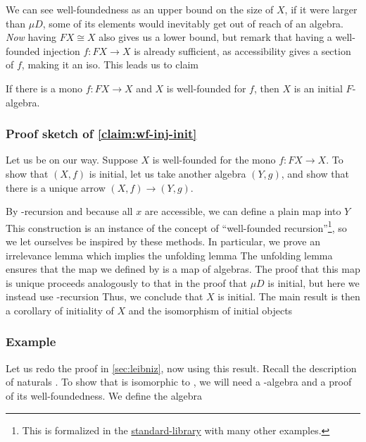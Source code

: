 We can see well-foundedness as an upper bound on the size of $X$, if it were larger than $\mu D$, some of its elements would inevitably get out of reach of an algebra. \textit{Now} having $FX \cong X$ also gives us a lower bound, but remark that having a well-founded injection $f: FX \to X$ is already sufficient, as accessibility gives a section of $f$, making it an iso. This leads us to claim
\begin{claim}\label{claim:wf-inj-init}
    If there is a mono $f : FX \to X$ and $X$ is well-founded for $f$, then $X$ is an initial $F$-algebra.
\end{claim}

\subsubsection{Proof sketch of \autoref{claim:wf-inj-init}}
Let us be on our way. Suppose $X$ is well-founded for the mono $f : FX \to X$. To show that $(X, f)$ is initial, let us take another algebra $(Y, g)$, and show that there is a unique arrow $(X, f) \to (Y, g)$.

By -recursion and because all $x$ are accessible, we can define a plain map into $Y$
This construction is an instance of the concept of ``well-founded recursion''\footnote{This is formalized in the \href{https://agda.github.io/agda-stdlib/Induction.WellFounded.html}{standard-library} with many other examples.}, so we let ourselves be inspired by these methods. In particular, we prove an irrelevance lemma
which implies the unfolding lemma
The unfolding lemma ensures that the map we defined by  is a map of algebras. The proof that this map is unique proceeds analogously to that in the proof that $\mu D$ is initial, but here we instead use -recursion
Thus, we conclude that $X$ is initial. The main result is then a corollary of initiality of $X$ and the isomorphism of initial objects


\subsubsection{Example}
Let us redo the proof in \autoref{sec:leibniz}, now using this result. Recall the description of naturals . To show that  is isomorphic to , we will need a -algebra and a proof of its well-foundedness. We define the algebra

